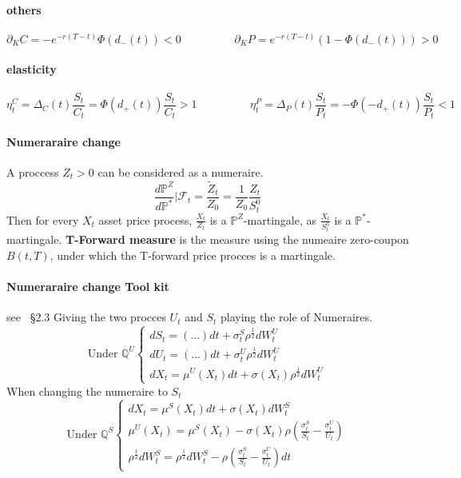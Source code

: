 \documentclass[a4paper,10pt]{article}
\begin{document}
\paragraph{others}
\[
\partial_{K}C = -e^{-r(T-t)} \Phi(d_-(t)) <0
\hspace{2cm}
\partial_{K}P = e^{-r(T-t)} (1-\Phi(d_-(t))) >0
\]
\paragraph{elasticity}
\[
\eta^C_t = \Delta_C(t) \frac{S_t}{C_t} = \Phi(d_+(t))\frac{S_t}{C_t}  > 1
\hspace{2cm}
\eta^P_t = \Delta_P(t) \frac{S_t}{P_t} = -\Phi(-d_+(t))\frac{S_t}{P_t} < 1
\]



\paragraph{Numeraraire change }
A proccess $Z_t > 0$ can be considered as a numeraire. 
\[
\frac{d\mathbb{P}^{Z}}{d\mathbb{P}^*} | \mathcal{F}_t = \frac{\widetilde{Z}_t }{Z_0} = \frac{1}{Z_0} \frac{Z_t}{S^0_t} 
\]
Then for every $X_t$ asset price process, $\frac{X_t}{Z_t}$ is a $\mathbb{P}^Z$-martingale, as $\frac{X_t}{S^0_t}$ is a $\mathbb{P}^*$-martingale. 
\textbf{T-Forward measure } is the measure using the numeaire zero-coupon $B(t,T)$, under which the T-forward price procces is a martingale.
\paragraph{Numeraraire change Tool kit} see ~\cite{BRIGO2006}\S 2.3
Giving the two procces $U_t$ and $S_t$ playing the role of Numeraires. 
\[
\text{Under } \mathbb{Q}^{U} 
\left\{
\begin{array}{l}
dS_t = (...)dt + \sigma_t^{S}\rho^{\frac{1}{2}}dW^{U}_t \\[5pt]
dU_t = (...)dt + \sigma_t^{U}\rho^{\frac{1}{2}}dW^{U}_t \\[5pt]
dX_t = \mu^{U}(X_t)dt + \sigma(X_t)\rho^{\frac{1}{2}}dW^{U}_t 
\end{array}
\right.
\]
When changing the numeraire to $S_t$
\[
\text{Under } \mathbb{Q}^{S} 
\left\{
\begin{array}{l}
dX_t = \mu^{S}(X_t)dt + \sigma(X_t)dW^{S}_t  \\[5pt]
\mu^{U}(X_t) = \mu^{S}(X_t) - \sigma(X_t) \rho\left( \frac{\sigma^S_t}{S_t} - \frac{\sigma^U_t}{U_t} \right)   \\[5pt]
\rho^{\frac{1}{2}}dW^{S}_t = \rho^{\frac{1}{2}}dW^{S}_t - \rho\left( \frac{\sigma^S_t}{S_t} - \frac{\sigma^U_t}{U_t} \right)dt
\end{array}
\right.
\]
\end{document}

